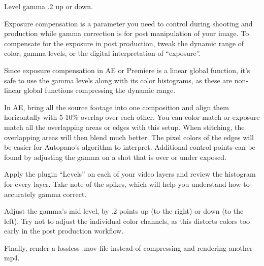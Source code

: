 \begin{fullwidth}
{\large Level gamma .2 up or down. \par}

Exposure compensation is a parameter you need to control during shooting and production while gamma correction is for post manipulation of your image. To compensate for the exposure in post production, tweak the dynamic range of color, gamma levels, or the digital interpretation of “exposure”. 

Since exposure compensation in AE or Premiere is a linear global function, it’s safe to use the gamma levels along with its color histograms, as these are non-linear global functions compressing the dynamic range. 

In AE, bring all the source footage into one composition and align them horizontally with 5-10\% overlap over each other. You can color match or exposure match all the overlapping areas or edges with this setup. When stitching, the overlapping areas will then blend much better. The pixel colors of the edges will be easier for Autopano’s algorithm to interpret. Additional control points can be found by adjusting the gamma on a shot that is over or under exposed.

Apply the plugin “Levels” on each of your video layers and review the histogram for every layer. Take note of the spikes, which will help you understand how to accurately gamma correct.

Adjust the gamma’s mid level, by .2 points up (to the right) or down (to the left). Try not to adjust the individual color channels, as this distorts colors too early in the post production workflow.

Finally, render a lossless .mov file instead of compressing and rendering another mp4.


\clearpage
\end{fullwidth}